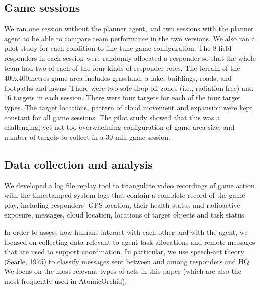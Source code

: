 \subsection{Game sessions}
\noindent We ran one session without the planner agent, and two sessions with the planner agent to be able to compare team performance in the two versions. We also ran a pilot study for each condition to fine tune game configuration. The 8 field responders in each session were randomly allocated a responder so that the whole team had two of each of the four kinds of responder roles. The terrain of the 400x400metres game area includes grassland, a lake, buildings, roads, and footpaths and lawns. There were two safe drop-off zones (i.e., radiation free) and 16 targets in each session. There were four targets for each of the four target types. The target locations, pattern of cloud movement and expansion were kept constant for all game sessions. The pilot study showed that this was a challenging, yet not too overwhelming configuration of game area size, and number of targets to collect in a 30 min game session. 

\subsection{Data collection and analysis}
\noindent We developed a log file replay tool to triangulate video recordings of game action with the timestamped system logs that contain a complete record of the game play, including responders' GPS location, their health status and radioactive exposure, messages, cloud location, locations of target objects and task status.


In order to assess how humans interact with each other and with the agent, we focused on collecting data relevant to agent task allocations and remote messages  that are used to support coordination. In particular, we use speech-act theory (Searle, 1975) to classify messages sent between and among responders and HQ. We focus on the most relevant types of acts in this paper (which are also the most frequently used in AtomicOrchid):

